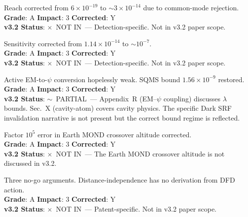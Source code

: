 \documentclass[11pt,a4paper]{article}
\newcommand{\vpartial}{\textcolor{statusPARTIAL}{$\sim$~PARTIAL}}
\newcommand{\vnot}{\textcolor{statusNOT}{$\times$~NOT IN}}
\begin{document}
\begin{tcolorbox}[colback=important!5,colframe=important,title=\textbf{F31: LIGO 6th Channel INVALIDATED}]
Reach corrected from $6 \times 10^{-19}$ to $\sim 3 \times 10^{-14}$ due to common-mode rejection.\\
\textbf{Grade}: A \quad \textbf{Impact}: 3 \quad \textbf{Corrected}: Y\\
\textbf{v3.2 Status}: \vnot\ --- Detection-specific. Not in v3.2 paper scope.
\end{tcolorbox}

\begin{tcolorbox}[colback=important!5,colframe=important,title=\textbf{F32: ESS Lund Channel A INVALIDATED}]
Sensitivity corrected from $1.14 \times 10^{-14}$ to $\sim 10^{-7}$.\\
\textbf{Grade}: A \quad \textbf{Impact}: 3 \quad \textbf{Corrected}: Y\\
\textbf{v3.2 Status}: \vnot\ --- Detection-specific. Not in v3.2 paper scope.
\end{tcolorbox}

\begin{tcolorbox}[colback=important!5,colframe=important,title=\textbf{F33: Dark SRF Bound INVALIDATED}]
Active EM-to-$\psi$ conversion hopelessly weak. SQMS bound $1.56 \times 10^{-9}$ restored.\\
\textbf{Grade}: A \quad \textbf{Impact}: 3 \quad \textbf{Corrected}: Y\\
\textbf{v3.2 Status}: \vpartial\ --- Appendix~R (EM--$\psi$ coupling) discusses $\lambda$ bounds. Sec.~X (cavity-atom) covers cavity physics. The specific Dark SRF invalidation narrative is not present but the correct bound regime is reflected.
\end{tcolorbox}

\begin{tcolorbox}[colback=important!5,colframe=important,title=\textbf{F34: Earth MOND Crossover Altitude: $22{,}000$~km $\to$ 12.6~AU}]
Factor $10^5$ error in Earth MOND crossover altitude corrected.\\
\textbf{Grade}: A \quad \textbf{Impact}: 3 \quad \textbf{Corrected}: Y\\
\textbf{v3.2 Status}: \vnot\ --- The Earth MOND crossover altitude is not discussed in v3.2.
\end{tcolorbox}

\begin{tcolorbox}[colback=important!5,colframe=important,title=\textbf{F35: P4 Underground WPT DEAD}]
Three no-go arguments. Distance-independence has no derivation from DFD action.\\
\textbf{Grade}: A \quad \textbf{Impact}: 3 \quad \textbf{Corrected}: Y\\
\textbf{v3.2 Status}: \vnot\ --- Patent-specific. Not in v3.2 paper scope.
\end{tcolorbox}
\end{document}
